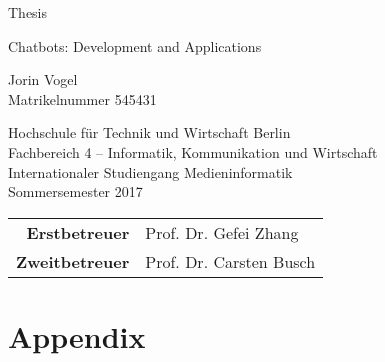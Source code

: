 


\pagestyle{empty} %

\clearscrheadings\clearscrplain
\begin{center}

Thesis\\
\vspace{2cm}

\begin{Large}
  Chatbots: Development and Applications\\
\vspace{2cm}
\end{Large}

Jorin Vogel \\
Matrikelnummer 545431\\

\vspace{8mm}

Hochschule für Technik und Wirtschaft Berlin\\
Fachbereich 4 – Informatik, Kommunikation und Wirtschaft\\
Internationaler Studiengang Medieninformatik\\
Sommersemester 2017

\vspace{2cm}

\begin{tabular}{rl}
{\bfseries Erstbetreuer} & Prof. Dr. Gefei Zhang\\
{\bfseries Zweitbetreuer} & Prof. Dr. Carsten Busch\\
\end{tabular}

\end{center}

\clearpage

\pagestyle{useheadings} %

\tableofcontents

% 

% 


\appendix
\chapter{Appendix}


